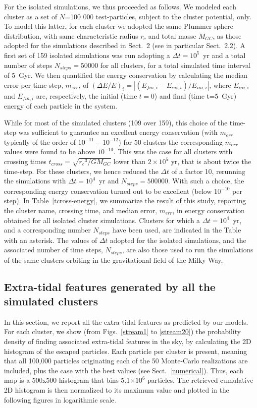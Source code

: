         For the isolated simulations, we thus proceeded as follows. We modeled each cluster as a set of $N$=100 000 test-particles, subject to the cluster potential, only. To model this latter, for each cluster we adopted the same Plummer sphere distribution, with same characteristic radius $r_c$ and total masse $M_{GC}$, as those adopted for the simulations described in Sect.~2 (see in particular Sect.~2.2).  A  first set of 159 isolated simulations was run adopting a   $\Delta t=10^5$~yr and a total number of steps $N_{steps}=50 000$ for all clusters, for a total simulated time interval of 5~Gyr.  We then quantified the energy conservation by calculating the median error per time-step, $m_{err}$, of $(\Delta E/E)_i=|(E_{fin,i}-E_{ini,i})/E_{ini,i}|$, where $E_{ini,i}$ and $E_{fin,i}$ are, respectively, the initial (time $t=0$) and final (time t=5~Gyr) energy of each particle in the system.

        While for most of the simulated clusters (109 over 159), this choice of the time-step was sufficient to guarantee an excellent energy conservation (with $m_{err}$ typically of the order of $10^{-11}-10^{-12}$) for 50 clusters the corresponding $m_{err}$ values were found to be above $10^{-10}$. This was the case for all clusters with crossing times $t_{cross}=\sqrt{{r_c}^3/GM_{GC}}$ lower than $2\times 10^5$ yr, that is about twice the time-step. For these clusters, we hence reduced the $\Delta t$ of a factor 10,  rerunning the simulations with $\Delta t=10^4$~yr and  $N_{steps}=500 000$. With such a choice, the corresponding energy conservation turned out to be excellent (below $10^{-10}$ per step). In Table~\ref{tcross-energy}, we summarize the  result of this study, reporting the cluster name, crossing time, and median error, $m_{err}$, in energy conservation obtained for all isolated cluster simulations. Clusters for which a $\Delta t=10^4$~yr, and a corresponding number $N_{steps}$ have been used, are indicated in the Table with an asterisk. The values of  $\Delta t$ adopted for the isolated simulations, and the associated number of time steps, $N_{steps}$, are also those used to run the simulations of the same clusters orbiting in the gravitational field of the Milky Way. 

    \subsection{Extra-tidal features generated by all the simulated clusters}\label{allstreams}

    In this section, we report all the extra-tidal features as predicted by our models. For each cluster, we show (from Figs.~\ref{stream1} to \ref{stream20}) the probability density of finding associated extra-tidal features in the sky, by calculating the 2D histogram of the escaped particles. Each particle per cluster is present, meaning that all 100,000 particles originating each of the 50 Monte-Carlo realizations are included, plus the case with the best values (see Sect.~\ref{numerical}). Thus, each map is a 500x500 histogram that bins 5.1$\times10^6$ particles. The retrieved cumulative 2D histogram is then normalized to its maximum value and plotted in the following figures in logarithmic scale. 

